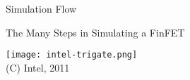 \begin{frame}{Simulation Flow}
 \begin{block}{The Many Steps in Simulating a FinFET}
  \begin{center}
   \texttt{[image: intel-trigate.png]} \\
   {\tiny (C) Intel, 2011 }
  \end{center}
 \end{block}
\end{frame}


% 
% 
% 
% 
% 
% 
% 
